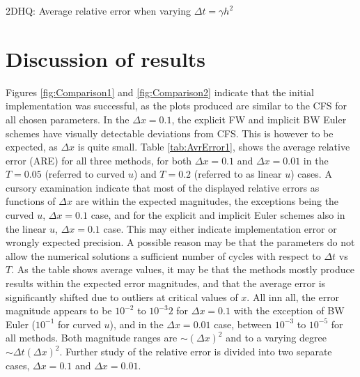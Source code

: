 \documentclass[%
oneside,                 %
final,                   %
10pt]{article}
\begin{document}
\begin{table}[h!tb]
    \centering
    \caption{2DHQ: Average relative error when varying $\Delta t=\gamma h^2$}
\label{tab:2DHQ.gamma}
\end{table}

\section{Discussion of results}
Figures \ref{fig:Comparison1} and \ref{fig:Comparison2} indicate that the initial implementation was successful, as the plots produced are similar to the CFS for all chosen parameters. In the $\Delta x=0.1$, the explicit FW and implicit BW Euler schemes have visually detectable deviations from CFS. This is however to be expected, as $\Delta x$ is quite small. \newline
Table \ref{tab:AvrError1}, shows the average relative error (ARE) for all three methods, for both $\Delta x=0.1$ and $\Delta x=0.01$ in the $T=0.05$ (referred to curved $u$) and $T=0.2$ (referred to as linear $u$) cases. A cursory examination indicate that most of the displayed relative errors as functions of $\Delta x$ are within the expected magnitudes, the exceptions being the curved $u$, $\Delta x=0.1$ case, and for the explicit and implicit Euler schemes also in the linear $u$, $\Delta x=0.1$ case. This may either indicate implementation error or wrongly expected precision. A possible reason may be that the parameters do not allow the numerical solutions a sufficient number of cycles with respect to $\Delta t$ vs $T$. As the table shows average values, it may be that the methods mostly produce results within the expected error magnitudes, and that the average error is significantly shifted due to outliers at critical values of $x$. All inn all, the error magnitude appears to be $10^{-2}$ to $10^{-3}2$ for $\Delta x=0.1$ with the exception of BW Euler ($10^{-1}$ for curved $u$), and in the $\Delta x=0.01$ case, between $10^{-3}$ to $10^{-5}$ for all methods. Both magnitude ranges are $\sim (\Delta x)^2$ and to a varying degree  $\sim \Delta t (\Delta x)^2$.  Further study of the relative error is divided into two separate cases, $\Delta x=0.1$ and $\Delta x=0.01$.\newline
\end{document}
